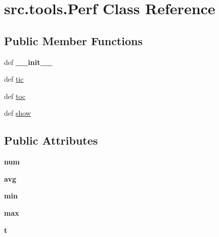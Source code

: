 \hypertarget{classsrc_1_1tools_1_1_perf}{\section{src.\-tools.\-Perf \-Class \-Reference}
\label{classsrc_1_1tools_1_1_perf}
}
\subsection*{\-Public \-Member \-Functions}
\begin{DoxyCompactItemize}
\item 
\hypertarget{classsrc_1_1tools_1_1_perf_ae919d5b427e84955a7b24c50db43215f}{def {\bfseries \-\_\-\-\_\-init\-\_\-\-\_\-}}\label{classsrc_1_1tools_1_1_perf_ae919d5b427e84955a7b24c50db43215f}

\item 
def \hyperlink{classsrc_1_1tools_1_1_perf_a0704b72e2ac5342defa88b5c550021a2}{tic}
\item 
def \hyperlink{classsrc_1_1tools_1_1_perf_a18a53770729072c60b8b7323b09c9d2a}{toc}
\item 
def \hyperlink{classsrc_1_1tools_1_1_perf_a3a93246501e8c3327e8e1a8e2c34e051}{show}
\end{DoxyCompactItemize}
\subsection*{\-Public \-Attributes}
\begin{DoxyCompactItemize}
\item 
\hypertarget{classsrc_1_1tools_1_1_perf_aa643b113c85e3bbb79594f7e891e261c}{{\bfseries num}}\label{classsrc_1_1tools_1_1_perf_aa643b113c85e3bbb79594f7e891e261c}

\item 
\hypertarget{classsrc_1_1tools_1_1_perf_a0ec2cd1d0283f00834da46b00a6fc284}{{\bfseries avg}}\label{classsrc_1_1tools_1_1_perf_a0ec2cd1d0283f00834da46b00a6fc284}

\item 
\hypertarget{classsrc_1_1tools_1_1_perf_a13fa4a0d1c9e7ef999d4870e27fdee07}{{\bfseries min}}\label{classsrc_1_1tools_1_1_perf_a13fa4a0d1c9e7ef999d4870e27fdee07}

\item 
\hypertarget{classsrc_1_1tools_1_1_perf_ae4714b793a290019961788298f7e4353}{{\bfseries max}}\label{classsrc_1_1tools_1_1_perf_ae4714b793a290019961788298f7e4353}

\item 
\hypertarget{classsrc_1_1tools_1_1_perf_a0dc9b6afdeb4e9d14cf3436d8117b5e6}{{\bfseries t}}\label{classsrc_1_1tools_1_1_perf_a0dc9b6afdeb4e9d14cf3436d8117b5e6}

\end{DoxyCompactItemize}


